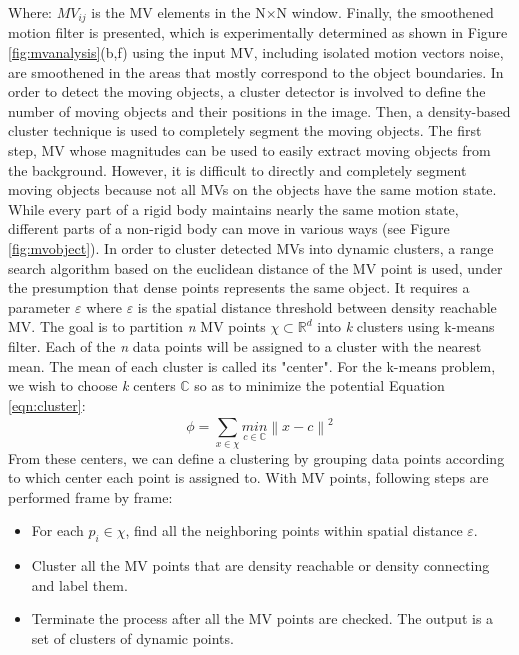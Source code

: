 Where: $MV_{ij}$ is the MV elements in the N×N window. Finally, the smoothened motion filter is presented, which is experimentally determined as shown in Figure \ref{fig:mvanalysis}(b,f) using the input MV, including isolated motion vectors noise, are smoothened in the areas that mostly correspond to the object boundaries. In order to detect the moving objects, a cluster detector is involved to define the number of moving objects and their positions in the image. Then, a density-based cluster technique is used to completely segment the moving objects. The first step, MV whose magnitudes can be used to easily extract moving objects from the background. However, it is difficult to directly and completely segment moving objects because not all MVs on the objects have the same motion state. While every part of a rigid body maintains nearly the same motion state, different parts of a non-rigid body can move in various ways (see Figure \ref{fig:mvobject}). In order to cluster detected MVs into dynamic clusters, a range search algorithm based on the euclidean distance of the MV point is used, under the presumption that dense points represents the same object. It requires a parameter $\varepsilon$ where $\varepsilon$ is the spatial distance threshold between density reachable MV. The goal is to partition \textit{n} MV points $\chi \subset \mathbb{R}^{d}$ into \textit{k} clusters using k-means filter. Each of the \textit{n} data points will be assigned to a cluster with the nearest mean. The mean of each cluster is called its "center". For the k-means problem, we wish to choose \textit{k} centers $\mathbb{C}$ so as to minimize the potential Equation \ref{eqn:cluster}: \\
\begin{equation}
\label{eqn:cluster}
\phi = \sum_{x \in \chi}^{}\underset{c \in \mathbb{C}}{min}\left \| x - c \right \|^{2}
\end{equation} 
From these centers, we can define a clustering by grouping data points according to which center each point is assigned to. With MV points, following steps are performed frame by frame:
\begin{itemize}
\item For each $p_{i} \in \chi$, find all the neighboring points within spatial distance $\varepsilon$.
\item Cluster all the MV points that are density reachable or density connecting \cite{ester1996density} and label them.
\item Terminate the process after all the MV points are checked. The output is a set of clusters of dynamic points.
\end{itemize}
